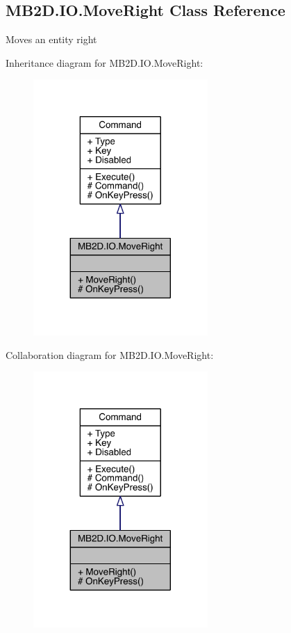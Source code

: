 \hypertarget{class_m_b2_d_1_1_i_o_1_1_move_right}{}\subsection{M\+B2\+D.\+I\+O.\+Move\+Right Class Reference}
\label{class_m_b2_d_1_1_i_o_1_1_move_right}


Moves an entity right  




Inheritance diagram for M\+B2\+D.\+I\+O.\+Move\+Right\+:
\nopagebreak
\begin{figure}[H]
\begin{center}
\leavevmode
\includegraphics[width=188pt]{class_m_b2_d_1_1_i_o_1_1_move_right__inherit__graph}
\end{center}
\end{figure}


Collaboration diagram for M\+B2\+D.\+I\+O.\+Move\+Right\+:
\nopagebreak
\begin{figure}[H]
\begin{center}
\leavevmode
\includegraphics[width=188pt]{class_m_b2_d_1_1_i_o_1_1_move_right__coll__graph}
\end{center}
\end{figure}
